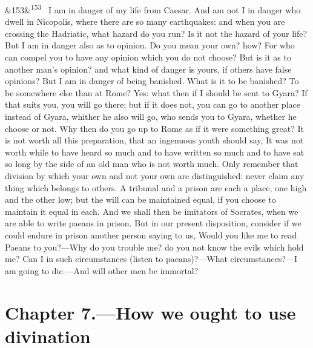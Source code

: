 \documentclass[12pt]{article}
\newcommand{\para}[1][]{\par\noindent\ifx&#1&\else\textsuperscript{\footnotesize #1}~\fi}
\begin{document}
\para[153] I am in danger of my life from Caesar. And am not I in danger who dwell in Nicopolis, where there are so many earthquakes: and when you are crossing the Hadriatic, what hazard do you run? Is it not the hazard of your life? But I am in danger also as to opinion. Do you mean your own? how? For who can compel you to have any opinion which you do not choose? But is it as to another man's opinion? and what kind of danger is yours, if others have false opinions? But I am in danger of being banished. What is it to be banished? To be somewhere else than at Rome? Yes: what then if I should be sent to Gyara? If that suits you, you will go there; but if it does not, you can go to another place instead of Gyara, whither he also will go, who sends you to Gyara, whether he choose or not. Why then do you go up to Rome as if it were something great? It is not worth all this preparation, that an ingenuous youth should say, It was not worth while to have heard so much and to have written so much and to have sat so long by the side of an old man who is not worth much. Only remember that division by which your own and not your own are distinguished: never claim any thing which belongs to others. A tribunal and a prison are each a place, one high and the other low; but the will can be maintained equal, if you choose to maintain it equal in each. And we shall then be imitators of Socrates, when we are able to write paeans in prison. But in our present disposition, consider if we could endure in prison another person saying to us, Would you like me to read Paeans to you?—Why do you trouble me? do you not know the evils which hold me? Can I in such circumstances (listen to paeans)?—What circumstances?—I am going to die.—And will other men be immortal?

\section*{Chapter 7.---How we ought to use divination}
\end{document}
